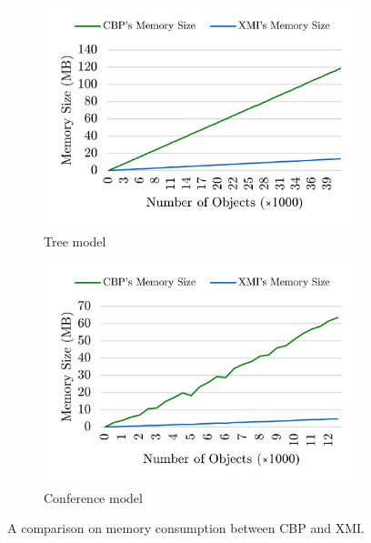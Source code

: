 \documentclass{llncs}
\begin{document}
\begin{figure}[ht]	
	\begin{subfigure}[t]{0.5\linewidth}
		\includegraphics[width=\linewidth]{memory_use_tree}
		\caption{Tree model}\label{fig:append_speed_tree}		
	\end{subfigure}
	\hfill
	\begin{subfigure}[t]{0.5\linewidth}
		\includegraphics[width=\linewidth]{memory_use_conf}
		\caption{Conference model}\label{fig:append_speed_conference}
	\end{subfigure}
	\caption{A comparison on memory consumption between CBP and XMI.}
	\label{fig:memory_use}
\end{figure}
\end{document}
